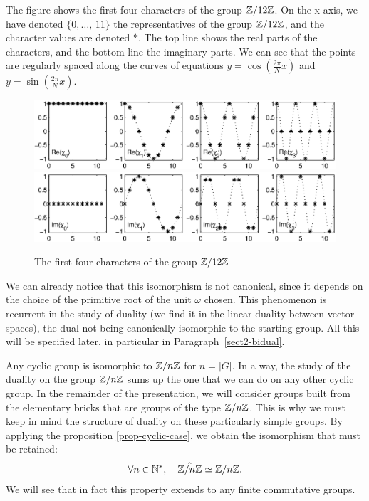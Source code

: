 The figure  shows the first four characters of the group $\mathbb{Z}/12 \mathbb{Z}$. On the x-axis, we have denoted $\{0, \ldots, \, 11\}$ the representatives of the group $\mathbb{Z}/12 \mathbb{Z}$, and the character values are denoted $ *$. The top line shows the real parts of the characters, and the bottom line the imaginary parts. We can see that the points are regularly spaced along the curves of equations $ y = \cos \left(\frac{2 \pi}{N} x \right)$ and $ y = \sin \left(\frac{2 \pi}{N} x \right)$.

\begin{figure}[ht]
    \begin{center}
    \includegraphics[scale=.7]{images/caracteres-cycliques-1.eps}
    \includegraphics[scale=.7]{images/caracteres-cycliques-2.eps}
    \end{center}
    \caption{The first four characters of the group $\mathbb{Z}/12\mathbb{Z}$}
\label{fig-cyclic-characters}
\end{figure}


\begin{rem}
We can already notice that this isomorphism is not canonical, since it depends on the choice of the primitive root of the unit $\omega $ chosen. This phenomenon is recurrent in the study of duality (we find it in the linear duality between vector spaces), the dual not being canonically isomorphic to the starting group. All this will be specified later, in particular in Paragraph~\ref{sect2-bidual}.
\end{rem}


\begin{rem}
\label{rmk-zpz-isomorphism}
 Any cyclic group is isomorphic to $\mathbb{Z}/n\mathbb{Z}$ for $n = |G|$. In a way, the study of the duality on the group $\mathbb{Z}/n\mathbb{Z}$ sums up the one that we can do on any other cyclic group. In the remainder of the presentation, we will consider groups built from the elementary bricks that are groups of the type $\mathbb{Z}/n\mathbb{Z}$. This is why we must keep in mind the structure of duality on these particularly simple groups. By applying the proposition \ref{prop-cyclic-case}, we obtain the isomorphism that must be retained:
\begin{equation*}
\forall n \in \mathbb{N}^*, \quad \hat{\mathbb{Z}/n\mathbb{Z}} \simeq \mathbb{Z}/n\mathbb{Z}.
\end{equation*}
We will see that in fact this property extends to any finite commutative groups.
\end{rem}


